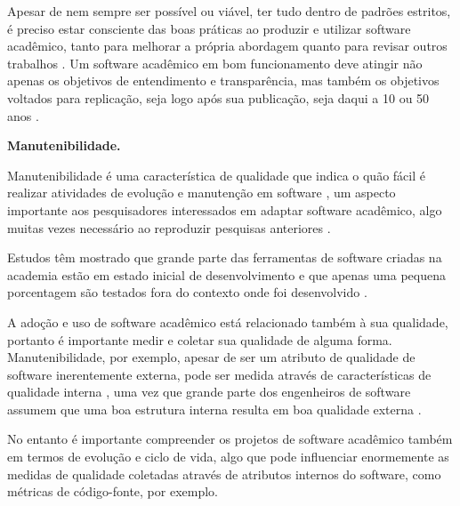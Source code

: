 \begin{description}
Apesar de nem sempre ser possível ou viável, ter tudo dentro de padrões
estritos, é preciso estar consciente das boas práticas ao produzir e utilizar
software acadêmico, tanto para melhorar a própria abordagem quanto para
revisar outros trabalhos \cite{wilson2014best}. Um software acadêmico em bom
funcionamento deve atingir não apenas os objetivos de entendimento e
transparência, mas também os objetivos voltados para replicação,
seja logo após sua publicação, seja daqui a 10 ou 50 anos \cite{stodden2010reproducible}.

\item \textbf{Manutenibilidade.}

Manutenibilidade é uma característica de qualidade que indica o quão fácil é
realizar atividades de evolução e manutenção em software
\cite{kumar2012survey}, um aspecto importante aos pesquisadores interessados em
adaptar software acadêmico, algo muitas vezes necessário ao reproduzir
pesquisas anteriores \cite{peng2011reproducible}.

Estudos têm mostrado que grande parte das ferramentas de software criadas na
academia estão em estado inicial de desenvolvimento \cite{marshall2013tools} e
que apenas uma pequena porcentagem são testados fora do contexto onde foi
desenvolvido \cite{portillo2012tools}.

A adoção e uso de software acadêmico está relacionado também à sua qualidade,
portanto é importante medir e coletar sua qualidade de alguma forma.
Manutenibilidade, por exemplo, 
apesar de ser um atributo de qualidade de software inerentemente externa, 
pode ser medida através de características de qualidade interna \cite{hashim1996software,
dagpinar2003predicting}, uma vez que grande parte dos engenheiros de software
assumem que uma boa estrutura interna resulta em boa qualidade externa
\cite{fenton2014software}.

No entanto é importante compreender os projetos de software acadêmico também em
termos de evolução e ciclo de vida, algo que pode influenciar enormemente as
medidas de qualidade coletadas através de atributos internos do software, como
métricas de código-fonte, por exemplo. 

\end{description}
